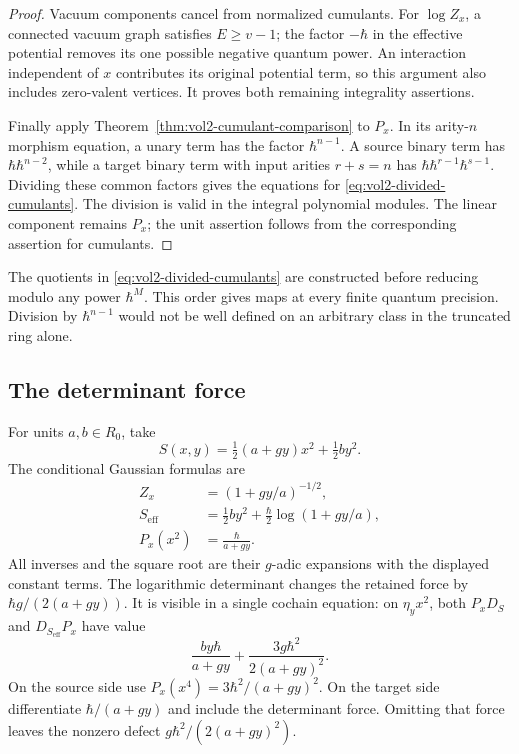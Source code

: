 \begin{proof}
Vacuum components cancel from normalized cumulants. For
$\log Z_x$, a connected vacuum graph satisfies $E\geq v-1$;
the factor $-\hbar$ in the effective potential removes its
one possible negative quantum power. An interaction independent
of $x$ contributes its original potential term, so this argument
also includes zero-valent vertices. It proves both remaining
integrality assertions.

Finally apply Theorem~\ref{thm:vol2-cumulant-comparison} to
$P_x$. In its arity-$n$ morphism equation, a unary term has
the factor $\hbar^{n-1}$. A source binary term has
$\hbar\hbar^{n-2}$, while a target binary term with input
arities $r+s=n$ has
$\hbar\hbar^{r-1}\hbar^{s-1}$. Dividing these common
factors gives the equations for \eqref{eq:vol2-divided-cumulants}.
The division is valid in the integral polynomial modules.
The linear component remains $P_x$; the unit assertion
follows from the corresponding assertion for cumulants.
\end{proof}

The quotients in \eqref{eq:vol2-divided-cumulants} are constructed
before reducing modulo any power $\hbar^M$. This order gives
maps at every finite quantum precision. Division by
$\hbar^{n-1}$ would not be well defined on an arbitrary
class in the truncated ring alone.

\subsection{The determinant force}

For units $a,b\in R_0$, take
\[
 S(x,y)=\tfrac12(a+gy)x^2+\tfrac12by^2.
\]
The conditional Gaussian formulas are
\begin{equation}\label{eq:vol2-determinant-force}
 \begin{aligned}
 Z_x&=(1+gy/a)^{-1/2},\\
 S_{\mathrm{eff}}&=\tfrac12by^2
                         +\tfrac{\hbar}{2}\log(1+gy/a),\\
 P_x(x^2)&=\frac{\hbar}{a+gy}.
 \end{aligned}
\end{equation}
All inverses and the square root are their $g$-adic expansions
with the displayed constant terms. The logarithmic determinant
changes the retained force by $\hbar g/(2(a+gy))$.
It is visible in a single cochain equation: on $\eta_yx^2$,
both $P_xD_S$ and $D_{S_{\mathrm{eff}}}P_x$ have value
\begin{equation}\label{eq:vol2-determinant-force-value}
 \frac{by\hbar}{a+gy}
                  +\frac{3g\hbar^2}{2(a+gy)^2}.
\end{equation}
On the source side use $P_x(x^4)=3\hbar^2/(a+gy)^2$.
On the target side differentiate $\hbar/(a+gy)$ and include
the determinant force. Omitting that force leaves the
nonzero defect $g\hbar^2/(2(a+gy)^2)$.


